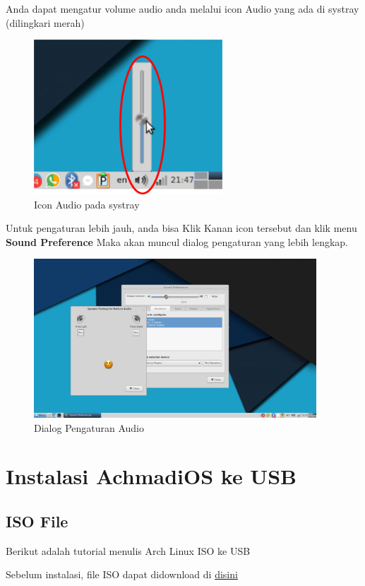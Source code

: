\documentclass[12pt,]{article}
\begin{document}
	Anda dapat mengatur volume audio anda melalui icon Audio yang ada di systray (dilingkari merah)
	
	\begin{figure}[h]
		\centering
		\includegraphics[width=200pt]{png/systrayaudio}
		\caption{Icon Audio pada systray}
	\end{figure}

	Untuk pengaturan lebih jauh, anda bisa Klik Kanan icon tersebut dan klik menu \textbf{Sound Preference}
	Maka akan muncul dialog pengaturan yang lebih lengkap.
	
	\begin{figure}[h]
		\centering
		\includegraphics[width=300pt]{png/audiodlg}
		\caption{Dialog Pengaturan Audio}
	\end{figure}
	
	\newpage
	\section{Instalasi AchmadiOS ke USB}
	
	\subsection{ISO File}
	Berikut adalah tutorial menulis Arch Linux ISO ke USB
	
	Sebelum instalasi, file ISO dapat didownload di \href{https://drive.google.com/open?id=0B1r9uekKJ7Z0ellkTVdmdUdYQmM}{disini}
	 
\end{document}
